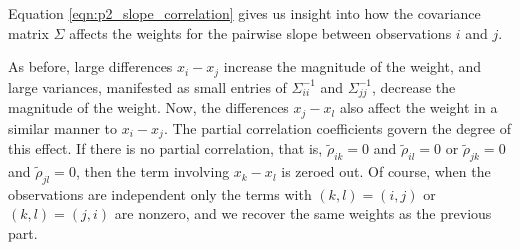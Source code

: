 \documentclass[11pt, letterpaper]{article}
\begin{document}
{\begin{enumerate}[(a)]
\begin{description}
    Equation \ref{eqn:p2_slope_correlation} gives us insight into how the
    covariance matrix $\Sigma$ affects the weights for the pairwise slope
    between observations $i$ and $j$.

    As before, large differences $x_i - x_j$ increase the magnitude of the
    weight, and large variances, manifested as small entries of
    $\Sigma_{ii}^{-1}$ and $\Sigma_{jj}^{-1}$, decrease the magnitude of the
    weight. Now, the differences $x_j - x_l$ also affect the weight in a similar
    manner to $x_i - x_j$. The partial correlation coefficients govern the
    degree of this effect. If there is no partial correlation, that is,
    $\tilde{\rho}_{ik} = 0$ and $\tilde{\rho}_{il} = 0$ or
    $\tilde{\rho}_{jk} = 0$ and $\tilde{\rho}_{jl} = 0$, then the term involving
    $x_{k} - x_{l}$ is zeroed out. Of course, when the observations are
    independent only the terms with $\left(k,l\right) = \left(i,j\right)$ or
    $\left(k,l\right) = \left(j,i\right)$ are nonzero, and we recover the same
    weights as the previous part.
  \end{description}
\end{enumerate} 


}
\end{document}
